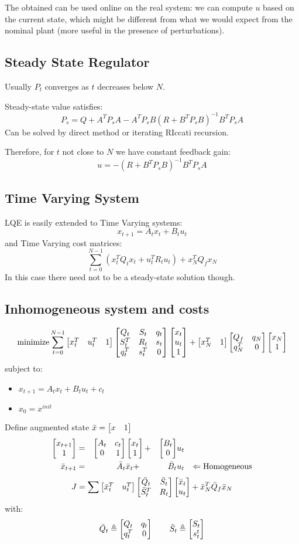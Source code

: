 The obtained  can be used online on the real system: we can compute $u$ based on the current state, which might be different from what we would expect from the nominal plant (more useful in the presence of perturbations).





\subsection{Steady State Regulator}
Usually $P_t$ converges as $t$ decreases below $N$.

Steady-state value satisfies:
\[P_s = Q+A^TP_sA - A^TP_sB(R+B^TP_sB)^{-1}B^TP_sA\]
Can be solved by direct method or iterating RIccati recursion.

Therefore, for $t$ not close to $N$ we have constant feedback gain:
\[u = -(R+B^TP_sB)^{-1}B^TP_sA\]
\subsection{Time Varying System}
LQE is easily extended to Time Varying systems:
\[x_{t+1} =A_tx_t + B_tu_t\]
and Time Varying cost matrices:
\[\sum_{t=0}^{N-1}(x_t^TQ_tx_t + u_t^TR_tu_t) + x_N^TQ_fx_N\]
In this case there need not to be a steady-state solution though.
\subsection{Inhomogeneous system and costs}
\[\operatorname*{minimize} \sum_{t=0}^{N-1}\begin{bmatrix}x_t^T&u_t^T&1\end{bmatrix}\begin{bmatrix}Q_t&S_t&q_t\\S_t^T&R_t&s_t\\q_t^T&s_t^T&0\end{bmatrix}\begin{bmatrix}x_t\\u_t\\1\end{bmatrix} + \begin{bmatrix}x_N^T&1\end{bmatrix}\begin{bmatrix}Q_f&q_N\\q_N^T&0\end{bmatrix}\begin{bmatrix}x_N\\1\end{bmatrix}\]
subject to:
\begin{itemize}
\item $x_{t+1} = A_tx_t + B_tu_t + c_t$
\item $x_0 = x^{init}$
\end{itemize}
Define augmented state $\bar{x} = \begin{bmatrix}x&1\end{bmatrix}$
\begin{align*}
\begin{bmatrix}x_{t+1}\\1\end{bmatrix} &=&\begin{bmatrix}A_t&c_t\\0&1\end{bmatrix}&\begin{bmatrix}x_t\\1\end{bmatrix} + &\begin{bmatrix}B_t\\0\end{bmatrix}&u_t&\\
\bar{x}_{t+1} &= &\bar{A}_t &\bar{x}_t  + &\bar{B}_t &u_t&\Leftarrow \text{Homogeneous}
\end{align*}
\[J = \sum \begin{bmatrix}\bar{x}_t^T&u_t^T\end{bmatrix}\begin{bmatrix}\bar{Q}_t&\bar{S}_t\\\bar{S}_t^T&R_t\end{bmatrix}\begin{bmatrix}\bar{x}_t\\u_t\end{bmatrix} + \bar{x}_N^T\bar{Q}_f\bar{x}_N\]
with:
\begin{gather*}
\bar{Q}_t\triangleq \begin{bmatrix}Q_t&q_t\\q_t^T&0\end{bmatrix}\qquad\bar{S}_t\triangleq\begin{bmatrix}S_t\\s_t^t\end{bmatrix}
\end{gather*}

